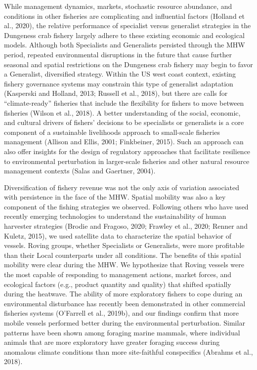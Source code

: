 \documentclass[]{elsarticle} %
\begin{document}
While management dynamics, markets, stochastic resource abundance, and
conditions in other fisheries are complicating and influential factors
(Holland et al., 2020), the relative performance of specialist versus
generalist strategies in the Dungeness crab fishery largely adhere to
these existing economic and ecological models. Although both Specialists
and Generalists persisted through the MHW period, repeated environmental
disruptions in the future that cause further seasonal and spatial
restrictions on the Dungeness crab fishery may begin to favor a
Generalist, diversified strategy. Within the US west coast context,
existing fishery governance systems may constrain this type of
generalist adaptation (Kasperski and Holland, 2013; Russell et al.,
2018), but there are calls for ``climate-ready'' fisheries that include
the flexibility for fishers to move between fisheries (Wilson et al.,
2018). A better understanding of the social, economic, and cultural
drivers of fishers' decisions to be specialists or generalists is a core
component of a sustainable livelihoods approach to small-scale fisheries
management (Allison and Ellis, 2001; Finkbeiner, 2015). Such an approach
can also offer insights for the design of regulatory approaches that
facilitate resilience to environmental perturbation in larger-scale
fisheries and other natural resource management contexts (Salas and
Gaertner, 2004).

Diversification of fishery revenue was not the only axis of variation
associated with persistence in the face of the MHW. Spatial mobility was
also a key component of the fishing strategies we observed. Following
others who have used recently emerging technologies to understand the
sustainability of human harvester strategies (Brodie and Fragoso, 2020;
Frawley et al., 2020; Renner and Kuletz, 2015), we used satellite data
to characterize the spatial behavior of vessels. Roving groups, whether
Specialists or Generalists, were more profitable than their Local
counterparts under all conditions. The benefits of this spatial mobility
were clear during the MHW. We hypothesize that Roving vessels were the
most capable of responding to management actions, market forces, and
ecological factors (e.g., product quantity and quality) that shifted
spatially during the heatwave. The ability of more exploratory fishers
to cope during an environmental disturbance has recently been
demonstrated in other commercial fisheries systems (O'Farrell et al.,
2019b), and our findings confirm that more mobile vessels performed
better during the environmental perturbation. Similar patterns have been
shown among foraging marine mammals, where individual animals that are
more exploratory have greater foraging success during anomalous climate
conditions than more site-faithful conspecifics (Abrahms et al., 2018).
\end{document}
